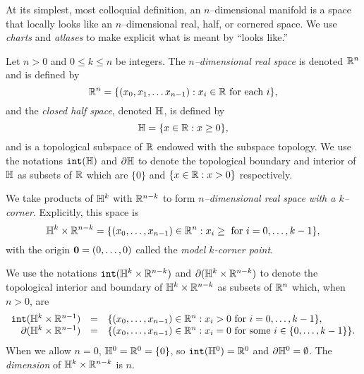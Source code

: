 At its simplest, most colloquial definition, an $n$--dimensional manifold is a space that locally looks like an $n$--dimensional real, half, or cornered space.
We use \emph{charts} and \emph{atlases} to make explicit what is meant by ``looks like.''

%
%

\begin{defn}
	Let $n>0$ and $0\leq k\leq n$ be integers.
	The \emph{$n$--dimensional real space} is denoted $\mathbb{R}^n$ and is defined by
	\[
		\mathbb{R}^n=\{(x_0,x_1,\dots x_{n-1}):x_i\in\mathbb{R}\textrm{ for each }i\},
	\]
	and the \emph{closed half space}, denoted $\mathbb{H}$, is defined by
	\[
		\mathbb{H}=\{x\in\mathbb{R}:x\geq 0\},
	\]
	and is a topological subspace of $\mathbb{R}$ endowed with the subspace topology.
	We use the notations $\mathtt{int}(\mathbb{H})$ and $\partial \mathbb{H}$ to denote the topological boundary and interior of $\mathbb{H}$ as subsets of $\mathbb{R}$ which are $\{0\}$ and $\{x\in\mathbb{R}:x>0\}$ respectively.
	
	We take products of $\mathbb{H}^k$ with $\mathbb{R}^{n-k}$ to form \emph{$n$--dimensional real space with a $k$--corner}.
	Explicitly, this space is
	\[
		\mathbb{H}^k\times\mathbb{R}^{n-k} = \{(x_0,\dots,x_{n-1})\in\mathbb{R}^n:x_i\geq\textrm{ for } i=0,\dots,k-1\},
	\]
	with the origin $\mathbf{0}=(0,\dots,0)$ called the \emph{model $k$-corner point}.
	
	We use the notations $\mathtt{int}(\mathbb{H}^k\times\mathbb{R}^{n-k})$ and $\partial (\mathbb{H}^k\times\mathbb{R}^{n-k})$ to denote the topological interior and boundary of $\mathbb{H}^k\times\mathbb{R}^{n-k}$ as subsets of $\mathbb{R}^n$ which, when $n>0$, are
	\[
	\begin{array}{rcl}
	\mathtt{int}(\mathbb{H}^k\times\mathbb{R}^{n-1}) & = & \{(x_0,\dots,x_{n-1})\in\mathbb{R}^n : x_i > 0\textrm{ for }i=0,\dots,k-1\},\\
	\partial (\mathbb{H}^k\times\mathbb{R}^{n-1})	& = & \{(x_0,\dots,x_{n-1})\in\mathbb{R}^n : x_i = 0\textrm{ for some }i\in\{0,\dots,k-1\}\}.
	\end{array}
	\]
	When we allow $n=0$, $\mathbb{H}^0 = \mathbb{R}^0 = \{0\}$, so $\mathtt{int}(\mathbb{H}^0)=\mathbb{R}^0$ and $\partial\mathbb{H}^0=\emptyset$.
	The \emph{dimension} of $\mathbb{H}^k\times\mathbb{R}^{n-k}$ is $n$.
\end{defn}

